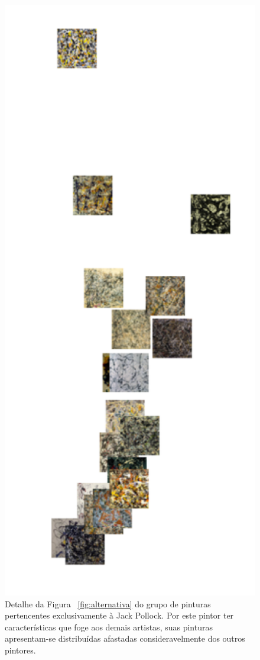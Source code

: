 \begin{figure}[h!]
  \begin{center}
    \includegraphics[scale=.4]{figs/detalhe2.pdf}
  \end{center}
  \caption{Detalhe da Figura ~\ref{fig:alternativa} do grupo de pinturas
    pertencentes exclusivamente à Jack Pollock. Por este pintor ter
    características que foge aos demais artistas, suas pinturas apresentam-se
    distribuídas afastadas consideravelmente dos outros pintores.}
  \label{fig:alternativa2}
\end{figure}


